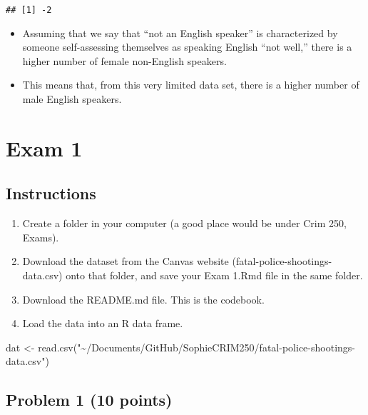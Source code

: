 \documentclass[
]{article}
\newenvironment{Shaded}{\begin{snugshade}}{\end{snugshade}}
\newcommand{\FunctionTok}[1]{\textcolor[rgb]{0.00,0.00,0.00}{#1}}
\newcommand{\NormalTok}[1]{#1}
\newcommand{\OtherTok}[1]{\textcolor[rgb]{0.56,0.35,0.01}{#1}}
\newcommand{\StringTok}[1]{\textcolor[rgb]{0.31,0.60,0.02}{#1}}
\providecommand{\tightlist}{%
  \setlength{\itemsep}{0pt}\setlength{\parskip}{0pt}}
\begin{document}
\begin{verbatim}
## [1] -2
\end{verbatim}

\begin{itemize}
\tightlist
\item
  Assuming that we say that ``not an English speaker'' is characterized
  by someone self-assessing themselves as speaking English ``not well,''
  there is a higher number of female non-English speakers.
\item
  This means that, from this very limited data set, there is a higher
  number of male English speakers.
\end{itemize}

\hypertarget{exam-1}{%
\section{Exam 1}\label{exam-1}}

\hypertarget{instructions}{%
\subsection{Instructions}\label{instructions}}

\begin{enumerate}
\def\labelenumi{\alph{enumi}.}
\item
  Create a folder in your computer (a good place would be under Crim
  250, Exams).
\item
  Download the dataset from the Canvas website
  (fatal-police-shootings-data.csv) onto that folder, and save your Exam
  1.Rmd file in the same folder.
\item
  Download the README.md file. This is the codebook.
\item
  Load the data into an R data frame.
\end{enumerate}

\begin{Shaded}
\begin{Highlighting}[]
\NormalTok{dat }\OtherTok{\textless{}{-}} \FunctionTok{read.csv}\NormalTok{(}\StringTok{"\textasciitilde{}/Documents/GitHub/SophieCRIM250/fatal{-}police{-}shootings{-}data.csv"}\NormalTok{)}
\end{Highlighting}
\end{Shaded}

\hypertarget{problem-1-10-points}{%
\subsection{Problem 1 (10 points)}\label{problem-1-10-points}}
\end{document}
